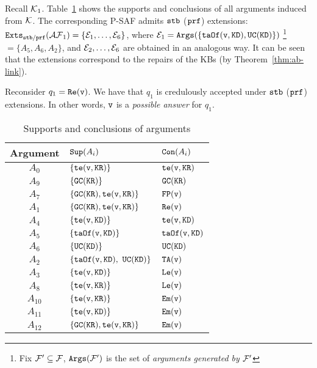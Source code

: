 \begin{example} 
\label{ex:KB-arg}
Recall $\mK_1$. Table~\ref{tab:arg} shows the supports and conclusions of all arguments induced from $\mK$. 
%
The corresponding P-SAF admits $\stb$ ($\prf$) extensions:
$\Exts_{\stb / \prf}(\mAF_1) = \{\mE_1, \ldots, \mE_6\}$, where
%
$\mE_1 = \Args(\{ \teAs(\vi,\kd), \uc(\kd)\})$ \footnote{Fix $\mF^{\prime} \subseteq \mF$, $\Args(\mF^{\prime})$ is the set of \emph{arguments generated by} $\mF^{\prime}$} $ = \{A_5, A_6, A_2\}$,
%
and $\mE_2, \ldots, \mE_6$ are obtained in an analogous way. It can be seen that the extensions correspond to the repairs of the KBs (by Theorem~\ref{thm:ab-link}). 

Reconsider $q_1 = \rese(\vi)$. We have that $q_1$ is credulously accepted under $\stb$ ($\prf$) extensions. In other words, $\vi$ is a \emph{possible answer} for $q_1$.  
\end{example}

\begin{table}\vspace{-6mm} 
\centering
  \caption{Supports and conclusions of arguments}
  \begin{tabular}{|c|l|l|}
    \hline
    \textbf{Argument} & \textbf{$\Sup(A_i)$} & \textbf{$\Con(A_i)$} \\
    \hline
   $A_0$ & $\{\te(\vi, \kr)\}$ & $\te(\vi, \kr)$ \\
   $A_9$ & $\{\gc(\kr)\}$ & $\gc(\kr)$ \\
   $A_7$ & $\{ \gc(\kr), \te(\vi, \kr) \}$ & $\fp(\vi)$ \\
   $A_1$ & $\{ \gc(\kr), \te(\vi, \kr) \}$ & $\rese(\vi)$\\
   $A_4$ & $\{\te(\vi, \kd)\}$ & $\te(\vi, \kd)$ \\
   $A_5$ & $\{\teAs(\vi, \kd)\}$ & $\teAs(\vi, \kd)$\\
   $A_6$ & $\{ \uc(\kd) \}$ & $\uc(\kd)$\\
   $A_2$ & $\{ \teAs(\vi, \kd),\ \uc(\kd) \}$ & $\ta(\vi)$\\
   $A_3$ & $\{\te(\vi, \kd)\}$ & $\lect(\vi)$ \\
   $A_{8}$ & $\{\te(\vi, \kr)\}$ & $\lect(\vi)$ \\
   $A_{10}$ & $\{\te(\vi, \kr)\}$ & $\emp(\vi)$ \\
   $A_{11}$ & $\{\te(\vi, \kd)\}$ & $\emp(\vi)$ \\
   $A_{12}$ & $\{ \gc(\kr), \te(\vi, \kr)\}$ & $\emp(\vi)$ \\
    \hline
  \end{tabular}
  \label{tab:arg} 
\end{table}   

